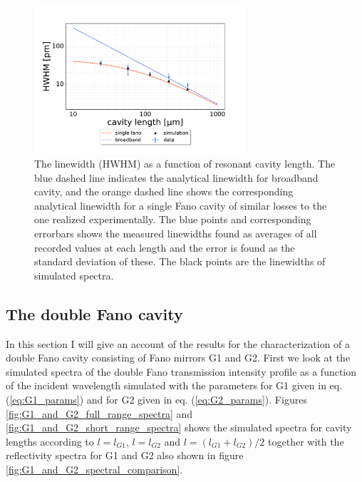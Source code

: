 \begin{figure}[h!]
    \centering
    \includegraphics[width=0.7\textwidth]{figures/results/HWHM_vs_cavity_length_single_fano.pdf}
    \caption{The linewidth (HWHM) as a function of resonant cavity length. The blue dashed line indicates the analytical linewidth for broadband cavity, and the orange dashed line shows the corresponding analytical linewidth for a single Fano cavity of similar losses to the one realized experimentally. The blue points and corresponding errorbars shows the measured linewidths found as averages of all recorded values at each length and the error is found as the standard deviation of these. The black points are the linewidths of simulated spectra.}
    \label{fig:HWHM_vs_length_single_fano_data}
\end{figure}

\clearpage
\subsection{The double Fano cavity}\label{sec:the_double_fano_cavity_results}

In this section I will give an account of the results for the characterization of a double Fano cavity consisting of Fano mirrors G1 and G2. First we look at the simulated spectra of the double Fano transmission intensity profile as a function of the incident wavelength simulated with the parameters for G1 given in eq. (\ref{eq:G1_params}) and for G2 given in eq. (\ref{eq:G2_params}). Figures \ref{fig:G1_and_G2_full_range_spectra} and \ref{fig:G1_and_G2_short_range_spectra} shows the simulated spectra for cavity lengths according to $l=l_{G1}$, $l=l_{G2}$ and $l=(l_{G1}+l_{G2})/2$ together with the reflectivity spectra for G1 and G2 also shown in figure \ref{fig:G1_and_G2_spectral_comparison}. 

